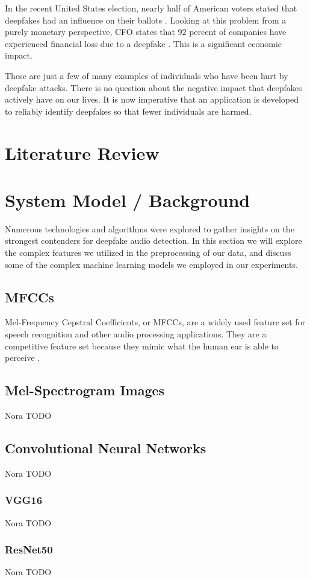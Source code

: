 \documentclass[sigconf,authordraft]{acmart}
\begin{document}
In the recent United States election, nearly half of American voters stated that deepfakes had an influence on their ballots \cite{b1}. Looking at this problem from a purely monetary perspective, CFO states that 92 percent of companies have experienced financial loss due to a deepfake \cite{b4}. This is a significant economic impact. 

These are just a few of many examples of individuals who have been hurt by deepfake attacks. There is no question about the negative impact that deepfakes actively have on our lives. It is now imperative that an application is developed to reliably identify deepfakes so that fewer individuals are harmed. 

\section{Literature Review}

\section{System Model / Background}
Numerous technologies and algorithms were explored to gather insights on the strongest contenders for deepfake audio detection. In this section we will explore the complex features we utilized in the preprocessing of our data, and discuss some of the complex machine learning models we employed in our experiments. 
\subsection{MFCCs}
Mel-Frequency Cepstral Coefficients, or MFCCs, are a widely used feature set for speech recognition and other audio processing applications. They are a competitive feature set because they mimic what the human ear is able to perceive \cite{9996362}. 

\subsection{Mel-Spectrogram Images}
Nora TODO
\subsection{Convolutional Neural Networks}
Nora TODO
\subsubsection{VGG16}
Nora TODO
\subsubsection{ResNet50}
Nora TODO
\end{document}
